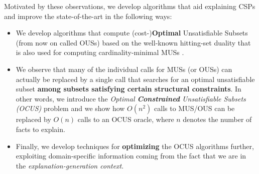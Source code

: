 Motivated by these observations, we develop algorithms that aid explaining CSPs and improve the state-of-the-art in the following ways: 
\begin{itemize}
 \item We develop algorithms that compute (cost-)\textbf{Optimal} Unsatisfiable Subsets (from now on called OUSs) based on the well-known hitting-set duality that is also used for computing cardinality-minimal MUSs \cite{ignatiev2015smallest,DBLP:conf/kr/SaikkoWJ16}.
\item We observe that many of the individual calls for MUSs (or OUSs) can actually be replaced by a single call that searches for an optimal unsatisfiable subset \textbf{among subsets satisfying certain structural constraints}. In other words, we introduce the \emph{Optimal \textbf{Constrained} Unsatisfiable Subsets (OCUS)} problem and we show how $O(n^2)$ calls to MUS/OUS can be replaced by $O(n)$ calls to an OCUS oracle, where $n$ denotes the number of facts to explain. 
\item Finally, we develop techniques for \textbf{optimizing} the OCUS algorithms further, exploiting domain-specific information coming from the fact that we are in the  \emph{explanation-generation context}. %
% 
% 
\end{itemize}



